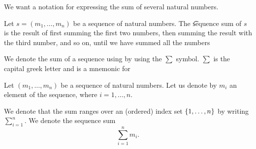 

We want a notation for expressing the sum of several natural numbers.


Let $s = (m_1, \dots, m_n)$ be a sequence of natural numbers. The \t{sequence sum} of $s$ is the result of first summing the first two numbers, then summing the result with the third number, and so on, until we have summed all the numbers


We denote the sum of a sequence using by using the $\sum$ symbol.  $\sum$ is the capital greek letter  and is a mnemonic for 

Let $(m_1, \dots, m_n)$ be a sequence of natural numbers.
Let us denote by $m_i$ an element of the sequence, where $i = 1, \dots, n$.

We denote that the sum ranges over an (ordered) index set $\{1, \dots, n\}$ by writing $\sum_{i = 1}^{n}$.
We denote the sequence sum
\[
  \sum_{i = 1}^{n} m_i.
\]

\blankpage
